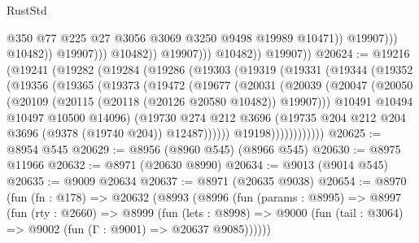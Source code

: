 \begin{lexlean}{RustStd}
\begin{coremodule}
                                          @350
                                          @77
                                          @225
                                          @27
                                          @3056
                                          @3069
                                          @3250
                                          @9498
                                          @19989
                                          @10471))
                                      @19907)))
                                @10482))
                            @19907)))
                      @10482))
                  @19907)))
            @10482))
        @19907))
@20624 := @19216
    (@19241
      (@19282
        (@19284
          (@19286
            (@19303
              (@19319
                (@19331
                  (@19344
                    (@19352
                      (@19356
                        (@19365
                          (@19373
                            (@19472
                              (@19677
                                (@20031
                                  (@20039
                                    (@20047
                                      (@20050
                                        (@20109 (@20115 (@20118 (@20126 @20580 @10482)) @19907)))
                                      @10491
                                      @10494
                                      @10497
                                      @10500
                                      @14096)
                                    (@19730
                                      @274
                                      @212
                                      @3696
                                      (@19735
                                        @204
                                        @212
                                        @204
                                        @3696
                                        (@9378 (@19740 @204))
                                        @12487))))))
                            @19198))))))))))))
@20625 := @8954 @545
@20629 := @8956 (@8960 @545) (@8966 @545)
@20630 := @8975 @11966
@20632 := @8971 (@20630 @8990)
@20634 := @9013 (@9014 @545)
@20635 := @9009 @20634
@20637 := @8971 (@20635 @9038)
@20654 := @8970
    (fun (fn : @178) =>
    @20632
      (@8993
        (@8996
          (fun (params : @8995) =>
          @8997
            (fun (rty : @2660) =>
            @8999
              (fun (lets : @8998) =>
              @9000 (fun (tail : @3064) => @9002 (fun (Γ : @9001) => @20637 @9085))))))

\end{coremodule}
\end{lexlean}
